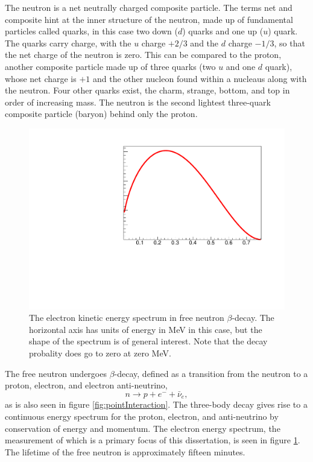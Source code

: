 The neutron is a net neutrally charged composite particle. The terms net and
composite hint at the inner structure of the neutron, made up of fundamental
particles called quarks, in this case two down ($d$) quarks and one up ($u$) quark.
The quarks carry charge, with the $u$ charge $+2/3$ and the $d$ charge
$-1/3$, so that the net charge of the neutron is zero. This can be compared
to the proton, another composite particle made up of three quarks (two $u$ and
one $d$ quark), whose net charge is $+1$ and the other nucleon found
within a nucleaus along with the neutron. Four other quarks exist,
the charm, strange, bottom, and top in order of increasing mass. The neutron
is the second lightest three-quark composite particle (baryon) 
behind only the proton.

\begin{figure}
  \centering
  \includegraphics[page=1,scale=0.4]{1-Introduction/betaSpectrum.pdf}
    \caption{The electron kinetic energy spectrum in free neutron $\beta$-decay. The horizontal
      axis has units of energy in MeV in this case, but the shape of the spectrum
      is of general interest. Note that the decay probality does go to zero at zero
      MeV.}
  \label{fig:betaSpectrum}
\end{figure}

The free neutron undergoes $\beta$-decay, defined as a transition from the neutron
to a proton, electron, and electron anti-neutrino,
\begin{equation*}
  n\rightarrow p + e^- + \bar{\nu}_{e},
\end{equation*}
\noindent as is also seen in figure \ref{fig:pointInteraction}.
The three-body decay gives rise to a continuous energy spectrum
for the proton, electron, and anti-neutrino by conservation of energy and momentum.
The electron energy spectrum, the measurement of which is a primary focus of this
dissertation, is seen in figure \ref{fig:betaSpectrum}. The lifetime of the free neutron is
approximately fifteen minutes.


